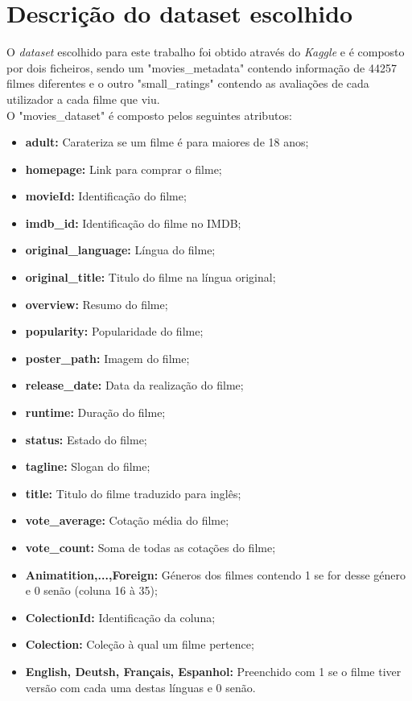 \section{Descrição do dataset escolhido}

O \textit{dataset} escolhido para este trabalho foi obtido através do \textit{Kaggle} e é composto por dois ficheiros, sendo um "movies\_metadata" contendo informação de  44257 filmes diferentes e o outro "small\_ratings" contendo as avaliações de cada utilizador a cada filme que viu. \\

O "movies\_dataset"  é composto pelos seguintes atributos:

\begin{itemize}
    \item \textbf{adult:} Carateriza se um filme é para maiores de 18 anos;
    \item \textbf{homepage:} Link para comprar o filme;
    \item \textbf{movieId:} Identificação do filme;
    \item \textbf{imdb\_id:} Identificação do filme no IMDB;
    \item \textbf{original\_language:} Língua do filme;
    \item \textbf{original\_title:} Titulo do filme na língua original;
    \item \textbf{overview:} Resumo do filme;
    \item \textbf{popularity:} Popularidade do filme;
    \item \textbf{poster\_path:} Imagem do filme;
    \item \textbf{release\_date:} Data da realização do filme;
    \item \textbf{runtime:} Duração do filme;
    \item \textbf{status:} Estado do filme;
    \item \textbf{tagline:} Slogan do filme;
    \item \textbf{title:} Titulo do filme traduzido para inglês;
    \item \textbf{vote\_average:} Cotação média do filme;
    \item \textbf{vote\_count:} Soma de todas as cotações do filme;
    \item \textbf{Animatition,...,Foreign:} Géneros dos filmes contendo 1 se for desse género e 0 senão (coluna 16 à 35);
    \item \textbf{ColectionId:} Identificação da coluna;
    \item \textbf{Colection:} Coleção à qual um filme pertence;
    \item \textbf{English, Deutsh, Français, Espanhol:} Preenchido com 1 se o filme tiver versão com cada uma destas línguas e 0 senão.
    \end{itemize}
    
